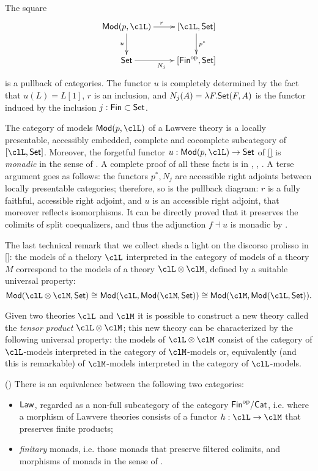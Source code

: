 \begin{corollary}
	The square
	\[
		\xymatrix{
			\cate{Mod}(p,\clL) \ar[d]_u \ar[r]^r & [\clL,\Set]\ar[d]^{p^*} \\
			\Set \ar[r]_{N_j} & [\cate{Fin}^\op,\Set]
		}
	\]
	is a pullback of categories. The functor $u$ is completely determined by the fact that $u(L) = L[1]$, $r$ is an inclusion, and $N_j(A) = \lambda F.\mathsf{Set}(F,A)$ is the functor induced by the inclusion $j : \mathsf{Fin} \subset \mathsf{Set}$.
\end{corollary}
\begin{corollary}
	The category of models $\cate{Mod}(p,\clL)$ of a Lawvere theory is a locally presentable, accessibly embedded, complete and cocomplete subcategory of $[\clL,\Set]$. Moreover, the forgetful functor $u : \cate{Mod}(p,\clL) \to \Set$ of \autoref{} is \emph{monadic} in the sense of \cite[4.4.1]{Bor2}. A complete proof of all these facts is in \cite[3.4.5]{Bor2}, \cite[3.9.1]{Bor2}, \cite[5.2.2.a]{Bor2}. A terse argument goes as follows: the functors $p^*, N_j$ are accessible right adjoints between locally presentable categories; therefore, so is the pullback diagram: $r$ is a fully faithful, accessible right adjoint, and $u$ is an accessible right adjoint, that moreover reflects isomorphisms. It can be directly proved that it preserves the colimits of split coequalizers, and thus the adjunction $f \dashv u$ is monadic by \cite[4.4.4]{Bor2}.
\end{corollary}
The last technical remark that we collect sheds a light on the discorso prolisso in \autoref{}: the models of a thelory $\clL$ interpreted in the category of models of a theory $M$ correspond to the models of a theory $\clL \otimes \clM$, defined by a suitable universal property:
\[
	\cate{Mod}(\clL\otimes \clM,\Set)  \cong
	\cate{Mod}(\clL, \cate{Mod}(\clM,\Set))  \cong
	\cate{Mod}(\clM, \cate{Mod}(\clL,\Set)).
\]
\begin{definition}
	Given two theories $\clL$ and $\clM$ it is possible to construct a new theory called the \emph{tensor product} $\clL \otimes \clM$; this new theory can be characterized by the following universal property: the models of $\clL \otimes \clM$ consist of the category of $\clL$-models interpreted in the category of $\clM$-models or, equivalently (and this is remarkable) of $\clM$-models interpreted in the category of $\clL$-models.
\end{definition}
\begin{theorem}
	(\cite[4.6.2]{Bor2}) There is an equivalence between the following two categories:
	\begin{itemize}
		\item $\mathsf{Law}$, regarded as a non-full subcategory of the category $\textsf{Fin}^{\text{op}}/\mathsf{Cat}$, i.e. where a morphism of Lawvere theories consists of a functor $h : \clL \to \clM$ that preserves finite products;
		\item \emph{finitary} monads, i.e. those monads that preserve filtered colimits, and morphisms of monads in the sense of \cite[4.5.8]{Bor2}.
	\end{itemize}
\end{theorem}
